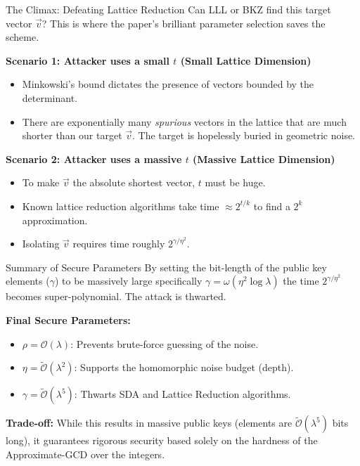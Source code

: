 \documentclass[10pt, aspectratio=169]{beamer}
\begin{document}
\begin{frame}{The Climax: Defeating Lattice Reduction}
    Can LLL or BKZ find this target vector $\vec{v}$? This is where the paper's brilliant parameter selection saves the scheme.
    \pause
    
    \vspace{0.3cm}
    \textbf{Scenario 1: Attacker uses a small $t$ (Small Lattice Dimension)}
    \begin{itemize}
        \item Minkowski's bound dictates the presence of vectors bounded by the determinant.
        \item There are exponentially many \textit{spurious} vectors in the lattice that are much shorter than our target $\vec{v}$. The target is hopelessly buried in geometric noise.
    \end{itemize}
    \pause
    
    \vspace{0.3cm}
    \textbf{Scenario 2: Attacker uses a massive $t$ (Massive Lattice Dimension)}
    \begin{itemize}
        \item To make $\vec{v}$ the absolute shortest vector, $t$ must be huge.
        \item Known lattice reduction algorithms take time $\approx 2^{t/k}$ to find a $2^k$ approximation.
        \item Isolating $\vec{v}$ requires time roughly $2^{\gamma / \eta^2}$.
    \end{itemize}
\end{frame}

\begin{frame}{Summary of Secure Parameters}
    By setting the bit-length of the public key elements ($\gamma$) to be massively large specifically $\gamma = \omega(\eta^2 \log \lambda)$ the time $2^{\gamma / \eta^2}$ becomes super-polynomial. The attack is thwarted.
    
    \vspace{0.3cm}
    \textbf{Final Secure Parameters:}
    \begin{itemize}
        \item $\rho = \mathcal{O}(\lambda)$: Prevents brute-force guessing of the noise.
        \item $\eta = \tilde{\mathcal{O}}(\lambda^2)$: Supports the homomorphic noise budget (depth).
        \item $\gamma = \tilde{\mathcal{O}}(\lambda^5)$: Thwarts SDA and Lattice Reduction algorithms.
    \end{itemize}
    \pause
    
    \vspace{0.3cm}
    \textbf{Trade-off:} While this results in massive public keys (elements are $\tilde{\mathcal{O}}(\lambda^5)$ bits long), it guarantees rigorous security based solely on the hardness of the Approximate-GCD over the integers.
\end{frame}
\end{document}
